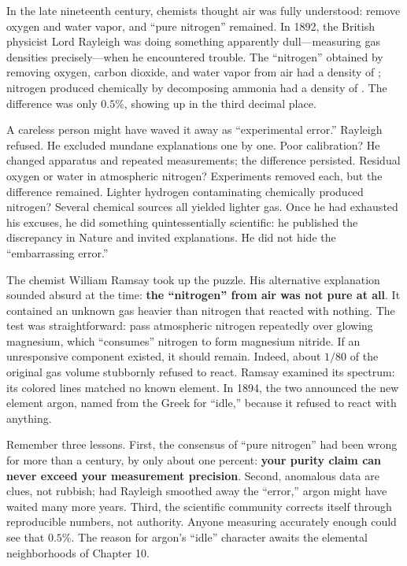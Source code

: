 \begin{zhengju}
In the late nineteenth century, chemists thought air was fully understood: remove oxygen and water vapor, and ``pure nitrogen'' remained. In 1892, the British physicist Lord Rayleigh was doing something apparently dull---measuring gas densities precisely---when he encountered trouble. The ``nitrogen'' obtained by removing oxygen, carbon dioxide, and water vapor from air had a density of ; nitrogen produced chemically by decomposing ammonia had a density of . The difference was only $0.5\%$, showing up in the third decimal place.

A careless person might have waved it away as ``experimental error.'' Rayleigh refused. He excluded mundane explanations one by one. Poor calibration? He changed apparatus and repeated measurements; the difference persisted. Residual oxygen or water in atmospheric nitrogen? Experiments removed each, but the difference remained. Lighter hydrogen contaminating chemically produced nitrogen? Several chemical sources all yielded lighter gas. Once he had exhausted his excuses, he did something quintessentially scientific: he published the discrepancy in Nature and invited explanations. He did not hide the ``embarrassing error.''

The chemist William Ramsay took up the puzzle. His alternative explanation sounded absurd at the time: \textbf{the ``nitrogen'' from air was not pure at all}. It contained an unknown gas heavier than nitrogen that reacted with nothing. The test was straightforward: pass atmospheric nitrogen repeatedly over glowing magnesium, which ``consumes'' nitrogen to form magnesium nitride. If an unresponsive component existed, it should remain. Indeed, about $1/80$ of the original gas volume stubbornly refused to react. Ramsay examined its spectrum: its colored lines matched no known element. In 1894, the two announced the new element argon, named from the Greek for ``idle,'' because it refused to react with anything.

Remember three lessons. First, the consensus of ``pure nitrogen'' had been wrong for more than a century, by only about one percent: \textbf{your purity claim can never exceed your measurement precision}. Second, anomalous data are clues, not rubbish; had Rayleigh smoothed away the ``error,'' argon might have waited many more years. Third, the scientific community corrects itself through reproducible numbers, not authority. Anyone measuring accurately enough could see that $0.5\%$. The reason for argon's ``idle'' character awaits the elemental neighborhoods of Chapter 10.
\end{zhengju}

